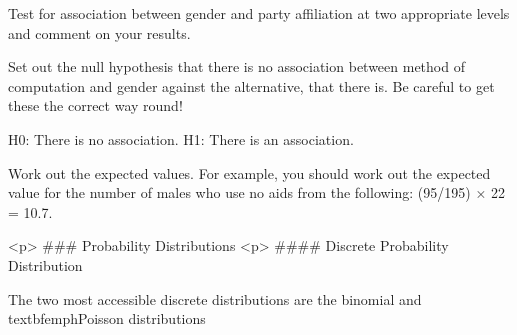 Test for association between gender and party affiliation at two appropriate levels
and comment on your results.

Set out the null hypothesis that there is no association between method of computation
and gender against the alternative, that there is. Be careful to get these the correct way
round!

H0: There is no association.
H1: There is an association.

Work out the expected values. For example, you should work out the expected value for
the number of males who use no aids from the following: (95/195) × 22 = 10.7.


<p>
### {Probability Distributions}
<p>
#### {Discrete Probability Distribution}


The two most accessible discrete distributions are the binomial and textbf{emph{Poisson}} distributions


